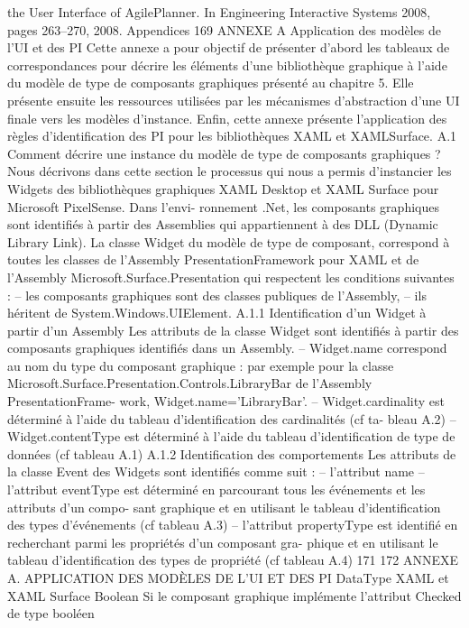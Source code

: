 \documentclass{article}
\begin{document}
the User Interface of AgilePlanner. In Engineering Interactive Systems 2008, pages
263–270, 2008.
Appendices
169
ANNEXE A
Application des modèles de l’UI et des PI
Cette annexe a pour objectif de présenter d’abord les tableaux de correspondances pour décrire les
éléments d’une bibliothèque graphique à l’aide du modèle de type de composants graphiques présenté
au chapitre 5. Elle présente ensuite les ressources utilisées par les mécanismes d’abstraction d’une UI
ﬁnale vers les modèles d’instance. Enﬁn, cette annexe présente l’application des règles d’identiﬁcation
des PI pour les bibliothèques XAML et XAMLSurface.
A.1
Comment décrire une instance du modèle de type de composants
graphiques ?
Nous décrivons dans cette section le processus qui nous a permis d’instancier les Widgets des
bibliothèques graphiques XAML Desktop et XAML Surface pour Microsoft PixelSense. Dans l’envi-
ronnement .Net, les composants graphiques sont identiﬁés à partir des Assemblies qui appartiennent à
des DLL (Dynamic Library Link).
La classe Widget du modèle de type de composant, correspond à toutes les classes de l’Assembly
PresentationFramework pour XAML et de l’Assembly Microsoft.Surface.Presentation qui respectent
les conditions suivantes :
– les composants graphiques sont des classes publiques de l’Assembly,
– ils héritent de System.Windows.UIElement.
A.1.1
Identiﬁcation d’un Widget à partir d’un Assembly
Les attributs de la classe Widget sont identiﬁés à partir des composants graphiques identiﬁés dans
un Assembly.
– Widget.name correspond au nom du type du composant graphique : par exemple pour la
classe Microsoft.Surface.Presentation.Controls.LibraryBar de l’Assembly PresentationFrame-
work, Widget.name=’LibraryBar’.
– Widget.cardinality est déterminé à l’aide du tableau d’identiﬁcation des cardinalités (cf ta-
bleau A.2)
– Widget.contentType est déterminé à l’aide du tableau d’identiﬁcation de type de données (cf
tableau A.1)
A.1.2
Identiﬁcation des comportements
Les attributs de la classe Event des Widgets sont identiﬁés comme suit :
– l’attribut name
– l’attribut eventType est déterminé en parcourant tous les événements et les attributs d’un compo-
sant graphique et en utilisant le tableau d’identiﬁcation des types d’événements (cf tableau A.3)
– l’attribut propertyType est identiﬁé en recherchant parmi les propriétés d’un composant gra-
phique et en utilisant le tableau d’identiﬁcation des types de propriété (cf tableau A.4)
171
172
ANNEXE A. APPLICATION DES MODÈLES DE L’UI ET DES PI
DataType
XAML et XAML Surface
Boolean
Si le composant graphique implémente l’attribut Checked de type booléen
\end{document}
